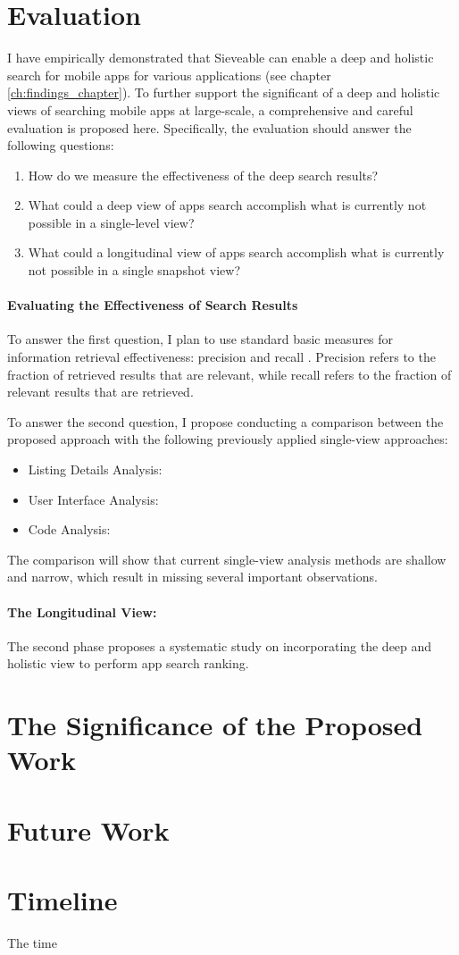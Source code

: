 \section{Evaluation}
I have empirically demonstrated that Sieveable can enable a deep and holistic search for mobile apps for various applications (see chapter \ref{ch:findings_chapter}).
To further support the significant of a deep and holistic views of searching mobile apps at large-scale, a comprehensive and careful evaluation is proposed here.
Specifically, the evaluation should answer the following questions:
\begin{enumerate}
	\item How do we measure the effectiveness of the deep search results?
	\item What could a deep view of apps search accomplish what is currently not possible in a single-level view?
	\item What could a longitudinal view of apps search accomplish what is currently not possible in a single snapshot view?
\end{enumerate}

\paragraph{Evaluating the Effectiveness of Search Results}
To answer the first question, I plan to use standard basic measures for information retrieval effectiveness: precision and recall \cite{manning_2008_intro_to_IR}.
Precision refers to the fraction of retrieved results that are relevant, while recall refers to the fraction of relevant results that are retrieved.

To answer the second question, I propose conducting a comparison between the proposed approach with the following previously applied single-view approaches:

\begin{itemize}
	\item Listing Details Analysis:
	\item User Interface Analysis:
	\item Code Analysis:
\end{itemize}
The comparison will show that current single-view analysis methods are shallow and narrow, which result in missing several important observations.

\paragraph{The Longitudinal View:}
The second phase proposes a systematic study on incorporating the deep and holistic view to perform app search ranking.

\section{The Significance of the Proposed Work}

\section{Future Work}
\section{Timeline}
The time


